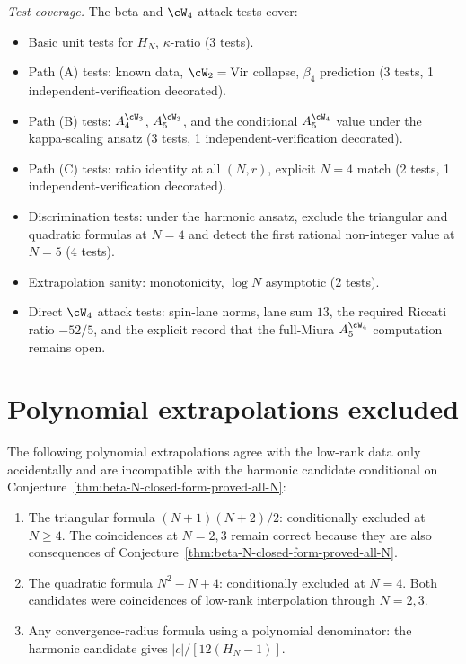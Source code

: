 \emph{Test coverage.} The beta and $\cW_4$ attack tests cover:
\begin{itemize}[nosep]
\item Basic unit tests for $H_N$, $\kappa$-ratio (3 tests).
\item Path (A) tests: known data, $\cW_2 = \mathrm{Vir}$ collapse,
 $\beta_4$ prediction (3 tests, 1 independent-verification decorated).
\item Path (B) tests: $A_4^{\cW_3}$, $A_5^{\cW_3}$, and the conditional
 $A_5^{\cW_4}$ value under the kappa-scaling ansatz
 (3 tests, 1 independent-verification decorated).
\item Path (C) tests: ratio identity at all $(N, r)$, explicit $N=4$
 match (2 tests, 1 independent-verification decorated).
\item Discrimination tests: under the harmonic ansatz, exclude the
 triangular and quadratic formulas at $N=4$ and detect the first
 rational non-integer value at $N=5$ (4 tests).
\item Extrapolation sanity: monotonicity, $\log N$ asymptotic (2 tests).
\item Direct $\cW_4$ attack tests: spin-lane norms, lane sum
 $13$, the required Riccati ratio \(-52/5\), and the explicit record
 that the full-Miura \(A_5^{\cW_4}\) computation remains open.
\end{itemize}

\section{Polynomial extrapolations excluded}
\label{sec:excluded-polynomial-extrapolations}

The following polynomial extrapolations agree with the low-rank data
only accidentally and are incompatible with the harmonic candidate
conditional on Conjecture~\ref{thm:beta-N-closed-form-proved-all-N}:

\begin{enumerate}[nosep]
\item The triangular formula $(N+1)(N+2)/2$: conditionally excluded at
 $N \ge 4$. The coincidences at $N = 2, 3$ remain correct because
 they are also consequences of
 Conjecture~\ref{thm:beta-N-closed-form-proved-all-N}.

\item The quadratic formula $N^2 - N + 4$: conditionally excluded at
 $N = 4$. Both candidates were coincidences of low-rank interpolation
 through $N = 2, 3$.

\item Any convergence-radius formula using a polynomial denominator:
 the harmonic candidate gives $|c|/[12(H_N - 1)]$.
\end{enumerate}

